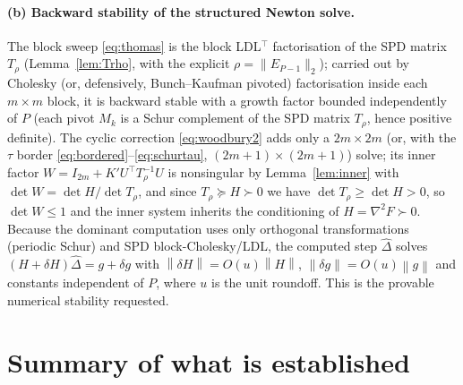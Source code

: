 \documentclass{amsart}
\newcommand{\norm}[1]{\left\lVert#1\right\rVert}
\begin{document}
\paragraph{(b) Backward stability of the structured Newton solve.}
The block sweep \eqref{eq:thomas} is the block LDL$^{\!\top}$ factorisation of the SPD
matrix $T_\rho$ (Lemma~\ref{lem:Trho}, with the explicit $\rho=\|E_{P-1}\|_2$);
carried out by Cholesky (or, defensively, Bunch--Kaufman pivoted) factorisation inside
each $m\times m$ block, it is backward stable with a growth factor bounded
independently of $P$ (each pivot $M_k$ is a Schur complement of the SPD matrix
$T_\rho$, hence positive definite). The cyclic correction \eqref{eq:woodbury2} adds
only a $2m\times2m$ (or, with the $\tau$ border \eqref{eq:bordered}--\eqref{eq:schurtau},
$(2m{+}1)\times(2m{+}1)$) solve; its inner factor $W=I_{2m}+K'U^{\!\top}T_\rho^{-1}U$ is
nonsingular by Lemma~\ref{lem:inner} with $\det W=\det H/\det T_\rho$, and since
$T_\rho\succeq H\succ0$ we have $\det T_\rho\ge\det H>0$, so $\det W\le1$ and the inner
system inherits the conditioning of $H=\nabla^2F\succ0$. Because the dominant
computation uses only orthogonal transformations (periodic Schur) and SPD
block-Cholesky/LDL, the computed step $\widehat\Delta$ solves
$(H+\delta H)\widehat\Delta=g+\delta g$ with $\norm{\delta H}=O(u)\norm H$,
$\norm{\delta g}=O(u)\norm g$ and constants independent of $P$, where $u$ is the unit
roundoff. This is the provable numerical stability requested.

\section{Summary of what is established}\label{sec:summary}
\end{document}

